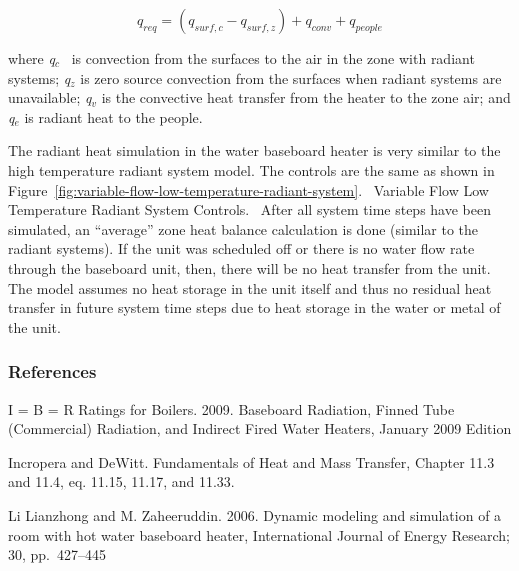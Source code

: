 \begin{equation}
{q_{req}} = ({q_{surf,c}} - {q_{surf,z}}) + {q_{conv}} + {q_{people}}
\end{equation}

where \emph{q\(_{c}\)} ~is convection from the surfaces to the air in the zone with radiant systems; \emph{q\(_{z}\)} is zero source convection from the surfaces when radiant systems are unavailable; \emph{q\(_{v}\)} is the convective heat transfer from the heater to the zone air; and \emph{q\(_{e}\)} is radiant heat to the people.

The radiant heat simulation in the water baseboard heater is very similar to the high temperature radiant system model. The controls are the same as shown in Figure~\ref{fig:variable-flow-low-temperature-radiant-system}.~ Variable Flow Low Temperature Radiant System Controls.~ After all system time steps have been simulated, an ``average'' zone heat balance calculation is done (similar to the radiant systems). If the unit was scheduled off or there is no water flow rate through the baseboard unit, then, there will be no heat transfer from the unit. The model assumes no heat storage in the unit itself and thus no residual heat transfer in future system time steps due to heat storage in the water or metal of the unit.

\subsubsection{References}\label{references-2-001}

I = B = R Ratings for Boilers. 2009. Baseboard Radiation, Finned Tube (Commercial) Radiation, and Indirect Fired Water Heaters, January 2009 Edition

Incropera and DeWitt. Fundamentals of Heat and Mass Transfer, Chapter 11.3 and 11.4, eq. 11.15, 11.17, and 11.33.

Li Lianzhong and M. Zaheeruddin. 2006. Dynamic modeling and simulation of a room with hot water baseboard heater, International Journal of Energy Research; 30, pp.~427--445
